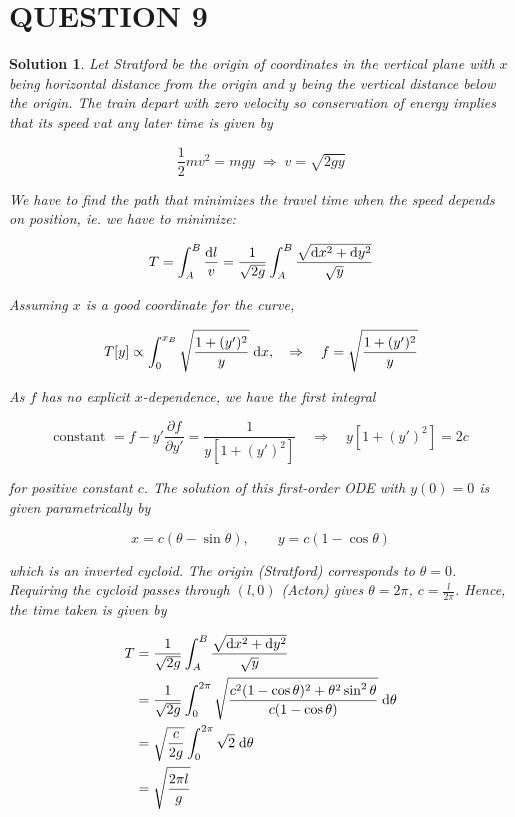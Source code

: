 \documentclass[a4paper]{article}
\newtheorem*{soln}{Solution}
\begin{document}
\section{QUESTION 9}
\begin{soln}
	Let Stratford be the origin of coordinates in the vertical plane with $ x $ being horizontal distance from the origin and $ y $ being the vertical distance below the origin. The train depart with zero velocity so conservation of energy implies that its speed $ v $at any later time is given by
	
	\[ \frac{1}{2}mv^{2} = mgy \; \Rightarrow \; v = \sqrt{2gy} \]
	
	We have to find the path that minimizes the travel time when the speed depends on position, ie. we have to minimize:
	
	\[ T = \int_{A}^{B} \frac{\mathrm{d} l}{v} = \frac{1}{\sqrt{2g}}\int_{A}^{B} \frac{\sqrt{\mathrm{d} x^{2} + \mathrm{d} y^{2}}}{\sqrt{y}} \]
	
	Assuming $ x $ is a good coordinate for the curve, 
	
	\[ T[y] \propto \int_{0}^{x_{B}} \sqrt{\frac{1 + (y')^{2}}{y}}  \; \mathrm{d} x, \quad \Rightarrow \quad f = \sqrt{\frac{1 + (y')^{2}}{y}}\]
	
	As $ f $ has no explicit $ x $-dependence, we have the first integral 
	
	\[ \text{constant } = f - y' \frac{\partial f }{\partial y'} = \frac{1}{y[1 + (y')^{2}]} \quad \Rightarrow \quad y [ 1 + (y')^{2}]  = 2c\]
	
	for positive constant $ c $. The solution of this first-order ODE with $ y(0) = 0 $ is given parametrically by
	
	\[ x = c(\theta - \sin \theta), \qquad y = c( 1 - \cos \theta) \]
	
	which is an inverted cycloid. The origin (Stratford) corresponds to $ \theta = 0 $. Requiring the cycloid passes through $ (l,0) $ (Acton) gives $ \theta = 2\pi $, $ c = \frac{l}{2 \pi} $. Hence, the time taken is given by
	
	\begin{align*}
	T & = \frac{1}{\sqrt{2g}}\int_{A}^{B} \frac{\sqrt{\mathrm{d} x^{2} + \mathrm{d} y^{2}}}{\sqrt{y}} \\
	& =  \frac{1}{\sqrt{2g}} \int_{0}^{2\pi} \sqrt{\frac{c^{2}(1 - \cos \theta)^{2} + \theta^{2} \sin^{2} \theta}{c(1 - \cos \theta)}} \; \mathrm{d} \theta \\
	& =  \sqrt{\frac{c}{2g}} \int_{0}^{2\pi} \sqrt{2} \; \mathrm{d} \theta\\
	& = \sqrt{\frac{2\pi l}{g}}
	\end{align*}
	
	
\end{soln}
\end{document}
